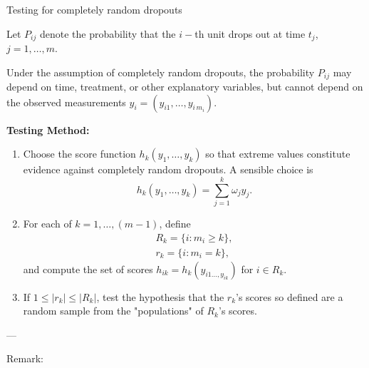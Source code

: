 \documentclass[UTF8,a4paper,10pt]{article}
\begin{document}



\begin{Problem}[]{Testing for completely random dropouts}

    Let \(P_{ij}\) denote the probability that the \(i-\)th unit drops out at time \(t_j\), \(j = 1,\ldots,m\).

    Under the assumption of completely random dropouts, the probability \(P_{ij}\) may depend on time, treatment, or other explanatory variables, but cannot depend on the observed measurements \(y_{i} = (y_{i1}, \ldots, y_{i\,m_i})\).

    \textbf{Testing Method:}
    \begin{enumerate}[label=(\alph*)]
        \item Choose the score function \(h_{k}(y_{1},\ldots,y_{k})\) so that extreme values constitute evidence against completely random dropouts. A sensible choice is 
        \[h_{k}(y_{1},\ldots,y_{k}) = \sum_{j=1}^{k}\omega_{j}y_{j}.\]
        \item For each of \(k = 1, \ldots, (m-1)\), define
        \begin{align*}
            R_{k} = \{i:m_i\geq k\},\\
            r_{k} = \{i:m_i = k\},
        \end{align*}
        and compute the set of scores \(h_{ik} = h_k(y_{i1\ldots,y_{ik}})\) for \(i\in R_{k}\).
        \item If \(1\leq |r_k|\leq |R_k|\), test the hypothesis that the \(r_k\)'s scores so defined are a random sample from the "populations" of \(R_k\)'s scores.
    \end{enumerate}
---

Remark:


\end{Problem}
\end{document}
